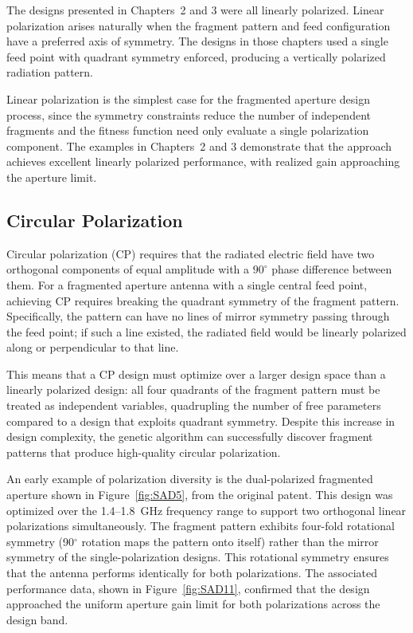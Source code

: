 The designs presented in Chapters~2 and 3 were all linearly polarized.  Linear polarization arises naturally when the fragment pattern and feed configuration have a preferred axis of symmetry.  The designs in those chapters used a single feed point with quadrant symmetry enforced, producing a vertically polarized radiation pattern.

Linear polarization is the simplest case for the fragmented aperture design process, since the symmetry constraints reduce the number of independent fragments and the fitness function need only evaluate a single polarization component.  The examples in Chapters~2 and 3 demonstrate that the approach achieves excellent linearly polarized performance, with realized gain approaching the aperture limit.

\subsection{Circular Polarization}
\label{sec:ch4cp}

Circular polarization (CP) requires that the radiated electric field have two orthogonal components of equal amplitude with a $90^\circ$ phase difference between them.  For a fragmented aperture antenna with a single central feed point, achieving CP requires breaking the quadrant symmetry of the fragment pattern.  Specifically, the pattern can have no lines of mirror symmetry passing through the feed point; if such a line existed, the radiated field would be linearly polarized along or perpendicular to that line.

This means that a CP design must optimize over a larger design space than a linearly polarized design: all four quadrants of the fragment pattern must be treated as independent variables, quadrupling the number of free parameters compared to a design that exploits quadrant symmetry.  Despite this increase in design complexity, the genetic algorithm can successfully discover fragment patterns that produce high-quality circular polarization.

An early example of polarization diversity is the dual-polarized fragmented aperture shown in Figure~\ref{fig:SAD5}, from the original patent.  This design was optimized over the 1.4--1.8~GHz frequency range to support two orthogonal linear polarizations simultaneously.  The fragment pattern exhibits four-fold rotational symmetry (90$^\circ$ rotation maps the pattern onto itself) rather than the mirror symmetry of the single-polarization designs.  This rotational symmetry ensures that the antenna performs identically for both polarizations.  The associated performance data, shown in Figure~\ref{fig:SAD11}, confirmed that the design approached the uniform aperture gain limit for both polarizations across the design band.


